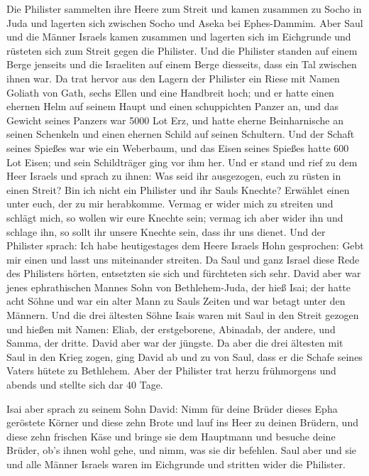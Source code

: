  Die Philister sammelten ihre Heere zum Streit und kamen
zusammen zu Socho in Juda und lagerten sich zwischen Socho und Aseka bei
Ephes-Dammim.  Aber Saul und die Männer Israels kamen
zusammen und lagerten sich im Eichgrunde und rüsteten sich zum Streit
gegen die Philister.  Und die Philister standen auf einem
Berge jenseits und die Israeliten auf einem Berge diesseits, dass ein
Tal zwischen ihnen war.  Da trat hervor aus den Lagern der
Philister ein Riese mit Namen Goliath von Gath, sechs Ellen und eine
Handbreit hoch;  und er hatte einen ehernen Helm auf
seinem Haupt und einen schuppichten Panzer an, und das Gewicht seines
Panzers war 5000 Lot Erz,  und hatte eherne Beinharnische
an seinen Schenkeln und einen ehernen Schild auf seinen Schultern.
 Und der Schaft seines Spießes war wie ein Weberbaum, und
das Eisen seines Spießes hatte 600 Lot Eisen; und sein Schildträger ging
vor ihm her.  Und er stand und rief zu dem Heer Israels
und sprach zu ihnen: Was seid ihr ausgezogen, euch zu rüsten in einen
Streit? Bin ich nicht ein Philister und ihr Sauls Knechte? Erwählet
einen unter euch, der zu mir herabkomme.  Vermag er wider
mich zu streiten und schlägt mich, so wollen wir eure Knechte sein;
vermag ich aber wider ihn und schlage ihn, so sollt ihr unsere Knechte
sein, dass ihr uns dienet.  Und der Philister sprach: Ich
habe heutigestages dem Heere Israels Hohn gesprochen: Gebt mir einen und
lasst uns miteinander streiten.  Da Saul und ganz Israel
diese Rede des Philisters hörten, entsetzten sie sich und fürchteten
sich sehr.  David aber war jenes ephrathischen Mannes
Sohn von Bethlehem-Juda, der hieß Isai; der hatte acht Söhne und war ein
alter Mann zu Sauls Zeiten und war betagt unter den Männern.
 Und die drei ältesten Söhne Isais waren mit Saul in den
Streit gezogen und hießen mit Namen: Eliab, der erstgeborene, Abinadab,
der andere, und Samma, der dritte.  David aber war der
jüngste. Da aber die drei ältesten mit Saul in den Krieg zogen,
 ging David ab und zu von Saul, dass er die Schafe seines
Vaters hütete zu Bethlehem.  Aber der Philister trat
herzu frühmorgens und abends und stellte sich dar 40 Tage.

 Isai aber sprach zu seinem Sohn David: Nimm für deine
Brüder dieses Epha geröstete Körner und diese zehn Brote und lauf ins
Heer zu deinen Brüdern,  und diese zehn frischen Käse und
bringe sie dem Hauptmann und besuche deine Brüder, ob's ihnen wohl gehe,
und nimm, was sie dir befehlen.  Saul aber und sie und
alle Männer Israels waren im Eichgrunde und stritten wider die
Philister.

